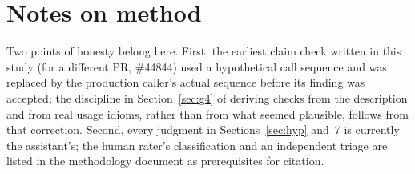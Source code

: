 \documentclass[11pt,a4paper]{article}
\begin{document}
\section*{Notes on method}
Two points of honesty belong here. First, the earliest claim check written in this study (for a different PR, \#44844) used a hypothetical call sequence and was replaced by the production caller's actual sequence before its finding was accepted; the discipline in Section~\ref{sec:g4} of deriving checks from the description and from real usage idioms, rather than from what seemed plausible, follows from that correction. Second, every judgment in Sections~\ref{sec:hyp} and~7 is currently the assistant's; the human rater's classification and an independent triage are listed in the methodology document as prerequisites for citation.
\end{document}
